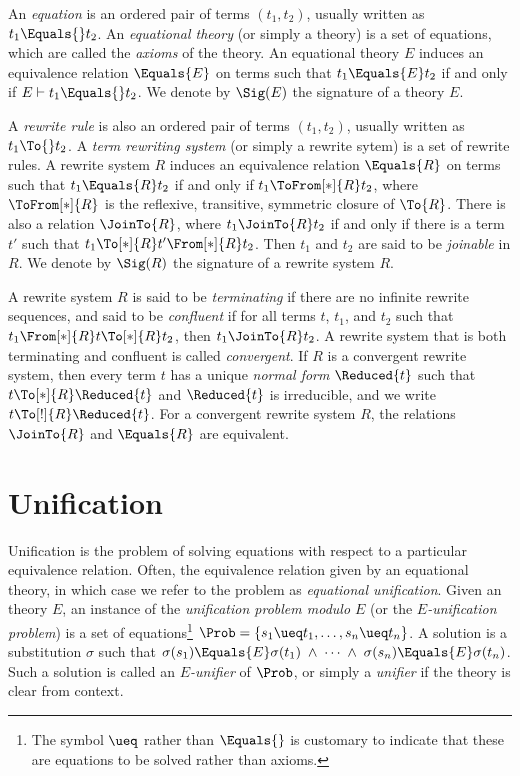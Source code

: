 An \emph{equation} is an ordered pair of terms $(t_1, t_2)$, usually written as
$t_1 \Equals{} t_2$. An \emph{equational theory} (or simply a theory) is a set
of equations, which are called the \emph{axioms} of the theory. An equational
theory $E$ induces an equivalence relation $\Equals{E}$ on terms such that $t_1
\Equals{E} t_2$ if and only if $E \vdash t_1 \Equals{} t_2$. We denote by
$\Sig(E)$ the signature of a theory $E$.

A \emph{rewrite rule} is also an ordered pair of terms $(t_1, t_2)$, usually
written as $t_1 \To{} t_2$. A \emph{term rewriting system} (or simply a rewrite
sytem) is a set of rewrite rules. A rewrite system $R$ induces an equivalence
relation $\Equals{R}$ on terms such that $t_1 \Equals{R} t_2$ if and only if
$t_1 \ToFrom[*]{R} t_2$, where $\ToFrom[*]{R}$ is the reflexive, transitive,
symmetric closure of $\To{R}$. There is also a relation $\JoinTo{R}$, where
$t_1 \JoinTo{R} t_2$ if and only if there is a term $t'$ such that $t_1
\To[*]{R} t' \From[*]{R} t_2$. Then $t_1$ and $t_2$ are said to be
\emph{joinable} in $R$. We denote by $\Sig(R)$ the signature of a rewrite
system $R$.

A rewrite system $R$ is said to be \emph{terminating} if there are no infinite
rewrite sequences, and said to be \emph{confluent} if for all terms $t$, $t_1$,
and $t_2$ such that $t_1 \From[*]{R} t \To[*]{R} t_2$, then $t_1 \JoinTo{R}
t_2$. A rewrite system that is both terminating and confluent is called
\emph{convergent}. If $R$ is a convergent rewrite system, then every term $t$
has a unique \emph{normal form} $\Reduced{t}$ such that $t \To[*]{R}
\Reduced{t}$ and $\Reduced{t}$ is irreducible, and we write $t \To[!]{R}
\Reduced{t}$. For a convergent rewrite system $R$, the relations $\JoinTo{R}$
and $\Equals{R}$ are equivalent.

\section{Unification}\label{sec:unification}

Unification is the problem of solving equations with respect to a particular
equivalence relation. Often, the equivalence relation given by an equational
theory, in which case we refer to the problem as \emph{equational unification}.
Given an theory $E$, an instance of the \emph{unification problem modulo $E$}
(or the \emph{$E$-unification problem}) is a set of equations\footnote{The
symbol $\ueq$ rather than $\Equals{}$ is customary to indicate that these are
equations to be solved rather than axioms.} $\Prob = \{ s_1 \ueq t_1, \dotsc,
s_n \ueq t_n \}$. A solution is a substitution $\sigma$ such that $\sigma(s_1)
\Equals{E} \sigma(t_1) \; \wedge \; \dotsb \; \wedge \; \sigma(s_n) \Equals{E}
\sigma(t_n)$. Such a solution is called an \emph{$E$-unifier} of $\Prob$, or
simply a \emph{unifier} if the theory is clear from context.

